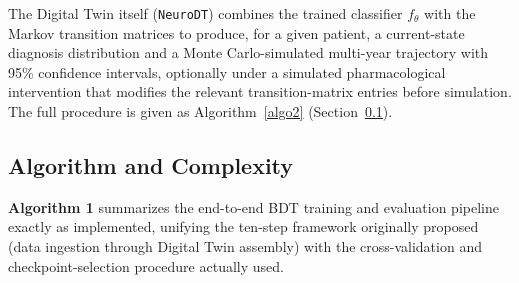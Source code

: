 \documentclass[pdflatex,sn-mathphys-num]{sn-jnl}%
\theoremstyle{thmstyleone}%
\theoremstyle{thmstyletwo}%
\theoremstyle{thmstylethree}%
\begin{document}
The Digital Twin itself (\texttt{NeuroDT}) combines the trained classifier $f_\theta$ with the Markov transition matrices to produce, for a given patient, a current-state diagnosis distribution and a Monte Carlo-simulated multi-year trajectory with 95\% confidence intervals, optionally under a simulated pharmacological intervention that modifies the relevant transition-matrix entries before simulation. The full procedure is given as Algorithm~\ref{algo2} (Section~\ref{sec3_8}).

\subsection{Algorithm and Complexity}\label{sec3_8}

\textbf{Algorithm 1} summarizes the end-to-end BDT training and evaluation pipeline exactly as implemented, unifying the ten-step framework originally proposed (data ingestion through Digital Twin assembly) with the cross-validation and checkpoint-selection procedure actually used.
\end{document}
